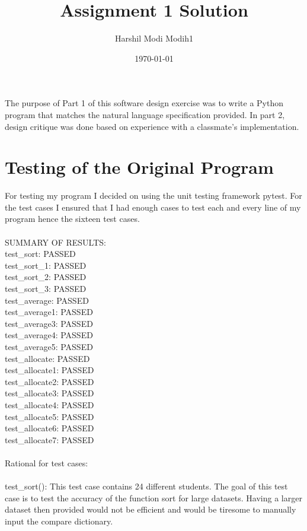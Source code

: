 \documentclass[12pt]{article}
\title{Assignment 1 Solution}
\author{Harshil Modi Modih1}
\date{\today}
\begin{document}
\maketitle

The purpose of Part 1 of this software design exercise was to write a Python program that matches the natural language specification provided. In part 2, design critique was done based on experience with a classmate's implementation.

\section{Testing of the Original Program}

For testing my program I decided on using the unit testing framework pytest. For the test cases I ensured that I had enough cases to test each and every line of my program hence the sixteen test cases.\\\\SUMMARY OF RESULTS:\\
test\_sort: PASSED\\
test\_sort\_1: PASSED\\
test\_sort\_2: PASSED\\
test\_sort\_3: PASSED\\
test\_average: PASSED\\
test\_average1: PASSED\\
test\_average3: PASSED\\
test\_average4: PASSED\\
test\_average5: PASSED\\
test\_allocate: PASSED\\
test\_allocate1: PASSED\\
test\_allocate2: PASSED\\
test\_allocate3: PASSED\\
test\_allocate4: PASSED\\
test\_allocate5: PASSED\\
test\_allocate6: PASSED\\
test\_allocate7: PASSED\\\\
Rational for test cases:\\\\
test\_sort(): This test case contains 24 different students. The goal of this test case is to test the accuracy of the function sort for large datasets. Having a larger dataset then provided would not be efficient and would be tiresome to manually input the compare dictionary.\\\\
\end{document}
